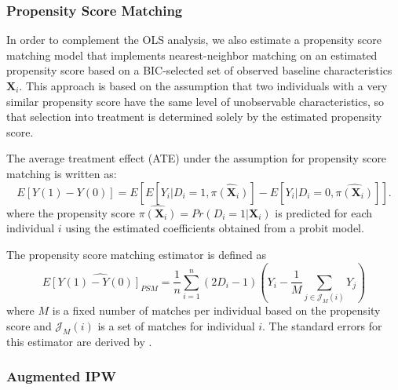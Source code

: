 \subsubsection{Propensity Score Matching}  \label{subsubsection:psm}

In order to complement the OLS analysis, we also estimate a propensity score matching model that implements nearest-neighbor matching on an estimated propensity score based on a BIC-selected set of observed baseline characteristics $\boldsymbol{X}_i$. This approach is based on the assumption that two individuals with a very similar propensity score have the same level of unobservable characteristics, so that selection into treatment is determined solely by the estimated propensity score. %

The average treatment effect (ATE) under the assumption for propensity score matching is written as:
\begin{equation} \label{eq:ATE-PSM}
E[Y(1)-Y(0)] = E[E[Y_i|D_i=1, \hat{\pi(\boldsymbol{X}_i)}] - E[Y_i|D_i=0, \hat{\pi(\boldsymbol{X}_i)}]].
\end{equation}
where the propensity score $\hat{\pi({\boldsymbol{X}_i})} = Pr(D_i=1|\boldsymbol{X}_i)$ is predicted for each individual $i$ using the estimated coefficients obtained from a probit model.

The propensity score matching estimator is defined as
\begin{equation} \label{eq:PSM-estimator}
\widehat{E[Y(1)-Y(0)]_{PSM}} = \frac{1}{n} \sum_{i=1}^{n} (2D_i -1)(Y_i - \frac{1}{M}\sum_{j \in \mathcal{J}_M(i)}Y_j )
\end{equation}
where $M$ is a fixed number of matches per individual based on the propensity score and $\mathcal{J}_M(i)$ is a set of matches for individual $i$. The standard errors for this estimator are derived by \cite{Abadie_Imbens_2006_Econometrica}.

\subsubsection{Augmented IPW} \label{subsubsection:aipw}

